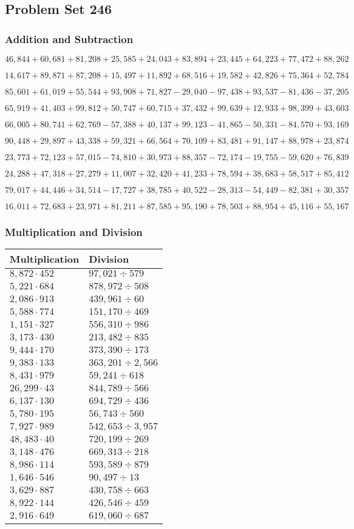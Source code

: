 \hypertarget{problem-set-246}{%
\subsection{Problem Set 246}\label{problem-set-246}}

\hypertarget{addition-and-subtraction}{%
\subsubsection{Addition and
Subtraction}\label{addition-and-subtraction}}

\(46,844+60,681+81,208+25,585+24,043+83,894+23,445+64,223+77,472+88,262\)

\(14,617+89,871+87,208+15,497+11,892+68,516+19,582+42,826+75,364+52,784\)

\(85,601+61,019+55,544+93,908+71,827-29,040-97,438+93,537-81,436-37,205\)

\(65,919+41,403+99,812+50,747+60,715+37,432+99,639+12,933+98,399+43,603\)

\(66,005+80,741+62,769-57,388+40,137+99,123-41,865-50,331-84,570+93,169\)

\(90,448+29,897+43,338+59,321+66,564+70,109+83,481+91,147+88,978+23,874\)

\(23,773+72,123+57,015-74,810+30,973+88,357-72,174-19,755-59,620+76,839\)

\(24,288+47,318+27,279+11,007+32,420+41,233+78,594+38,683+58,517+85,412\)

\(79,017+44,446+34,514-17,727+38,785+40,522-28,313-54,449-82,381+30,357\)

\(16,011+72,683+23,971+81,211+87,585+95,190+78,503+88,954+45,116+55,167\)

\hypertarget{multiplication-and-division}{%
\subsubsection{Multiplication and
Division}\label{multiplication-and-division}}

\begin{longtable}[]{@{}ll@{}}
\toprule
Multiplication & Division\tabularnewline
\midrule
\endhead
\(8,872\cdot452\) & \(97,021÷579\)\tabularnewline
\(5,221\cdot684\) & \(878,972÷508\)\tabularnewline
\(2,086\cdot913\) & \(439,961÷60\)\tabularnewline
\(5,588\cdot774\) & \(151,170 ÷469\)\tabularnewline
\(1,151\cdot327\) & \(556,310÷986\)\tabularnewline
\(3,173\cdot430\) & \(213,482÷835\)\tabularnewline
\(9,444\cdot170\) & \(373,390÷173\)\tabularnewline
\(9,383\cdot133\) & \(363,201÷2,566\)\tabularnewline
\(8,431\cdot979\) & \(59,241÷618\)\tabularnewline
\(26,299\cdot43\) & \(844,789÷566\)\tabularnewline
\(6,137\cdot130\) & \(694,729÷436\)\tabularnewline
\(5,780\cdot195\) & \(56,743÷560\)\tabularnewline
\(7,927\cdot989\) & \(542,653÷3,957\)\tabularnewline
\(48,483\cdot40\) & \(720,199÷269\)\tabularnewline
\(3,148\cdot476\) & \(669,313÷218\)\tabularnewline
\(8,986\cdot114\) & \(593,589÷879\)\tabularnewline
\(1,646\cdot546\) & \(90,497÷13\)\tabularnewline
\(3,629\cdot887\) & \(430,758÷663\)\tabularnewline
\(8,922\cdot144\) & \(426,546÷459\)\tabularnewline
\(2,916\cdot649\) & \(619,060÷687\)\tabularnewline
\bottomrule
\end{longtable}
